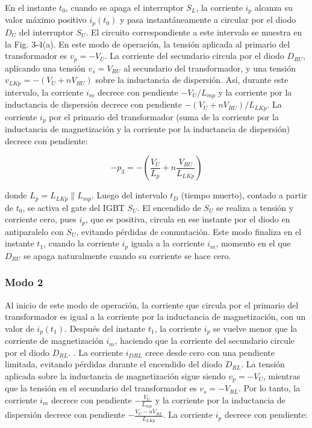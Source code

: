 En el instante \( t_0 \), cuando se apaga el interruptor \( S_L \), la corriente \( i_p \) alcanza su valor máximo positivo \( i_p(t_0) \) y pasa instantáneamente a circular por el diodo  \( D_U \) del interruptor \( S_U \). El circuito correspondiente a este intervalo se muestra en la Fig. 3-4(a). En este modo de operación, la tensión aplicada al primario del transformador es \( v_p = -V_U \). La corriente del secundario circula por el diodo \( D_{RU} \), aplicando una tensión \( v_s = V_{RU} \) al secundario del transformador, y una tensión \( v_{LKp} = -(V_U + nV_{RU}) \) sobre la inductancia de dispersión. Así, durante este intervalo, la corriente \( i_m \) decrece con pendiente \( -V_U / L_{mp} \) y la corriente por la inductancia de dispersión decrece con pendiente \( -(V_U + nV_{RU}) / L_{LKp} \). La corriente \( i_p \) por el primario del transformador (suma de la corriente por la inductancia de magnetización y la corriente por la inductancia de dispersión) decrece con pendiente:

\[
-p_3 = -\left( \frac{V_U}{L_p} + n \frac{V_{RU}}{L_{LKp}} \right)
\]

donde \( L_p = L_{LKp} \parallel L_{mp} \). Luego del intervalo \( t_D \) (tiempo muerto), contado a partir de \( t_0 \), se activa el gate del IGBT \( S_U \). El encendido de \( S_U \) se realiza a tensión y corriente cero, pues \( i_p \), que es positiva, circula en ese instante por el diodo en antiparalelo con \( S_U \), evitando pérdidas de conmutación. Este modo finaliza en el instante \( t_1 \), cuando la corriente \( i_p \) iguala a la corriente \( i_m \), momento en el que \( D_{RU} \) se apaga naturalmente cuando su corriente se hace cero.

\subsubsection{Modo 2}

Al inicio de este modo de operación, la corriente que circula por el primario del transformador es igual a la corriente por la inductancia de magnetización, con un valor de \( i_p(t_1) \). Después del instante \( t_1 \), la corriente \( i_p \) se vuelve menor que la corriente de magnetización \( i_m \), haciendo que la corriente del secundario circule por el diodo \( D_{RL} \). . La corriente \( i_{DRL} \) crece desde cero con una pendiente limitada, evitando pérdidas durante el encendido del diodo \( D_{RL} \). La tensión aplicada sobre la inductancia de magnetización sigue siendo \( v_p = -V_U \), mientras que la tensión en el secundario del transformador es \( v_s = -V_{RL} \). Por lo tanto, la corriente \( i_m \) decrece con pendiente \( -\frac{V_U}{L_{mp}} \) y la corriente por la inductancia de dispersión decrece con pendiente \( -\frac{V_U - nV_{RL}}{L_{LKp}} \). La corriente \( i_p \) decrece con pendiente:


